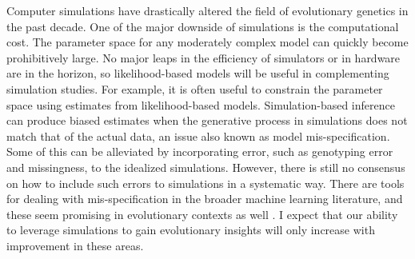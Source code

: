 Computer simulations have drastically altered the field of evolutionary genetics in the past decade.
One of the major downside of simulations is the computational cost.
The parameter space for any moderately complex model can quickly become prohibitively large.
No major leaps in the efficiency of simulators or in hardware are in the horizon, 
so likelihood-based models will be useful in complementing simulation studies.
For example, it is often useful to constrain the parameter space using estimates from likelihood-based models.
Simulation-based inference can produce biased estimates when the generative process in simulations does not match that of the actual data,
an issue also known as model mis-specification.
Some of this can be alleviated by incorporating error, such as genotyping error and missingness, to the idealized simulations.
However, there is still no consensus on how to include such errors to simulations in a systematic way.
There are tools for dealing with mis-specification in the broader machine learning literature,
and these seem promising in evolutionary contexts as well \citep{mo_domain-adaptive_2023}.
I expect that our ability to leverage simulations to gain evolutionary insights will only increase with improvement in these areas.
